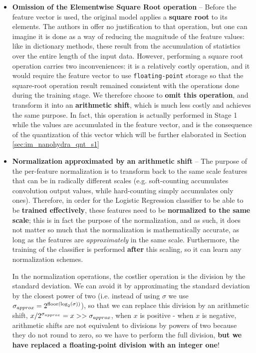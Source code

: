         \begin{itemize}
        \item \textbf{Omission of the Elementwise Square Root operation} --
        Before the feature vector is used, the original model applies a \textbf{square root} to its elements. 
        The authors in \cite{Dempster2023Hydra} offer no justification to that operation, but one can imagine it is done as a way of reducing the magnitude of the feature values: 
        like in dictionary methods, these result from the accumulation of statistics over the entire length of the input data. 
        However, performing a square root operation carries two inconveniences: it is a relatively costly operation, and it would require the feature vector 
        to use \verb|floating-point| storage so that the square-root operation result remained consistent with the operations done during the training stage.
        We therefore choose to \textbf{omit this operation}, and transform it into an \textbf{arithmetic shift}, which is much less costly and achieves the same purpose.
        In fact, this operation is actually performed in Stage 1 while the values are accumulated in the feature vector, and is the consequence of the quantization
        of this vector which will be further elaborated in Section \ref{sec:im_nanohydra_qnt_s1}

        \item \textbf{Normalization approximated by an arithmetic shift} --
        The purpose of the per-feature normalization is to transform back to the same scale features that can be in 
        radically different scales (e.g. soft-counting accumulates convolution output values, while hard-counting simply accumulates only ones). 
        Therefore, in order for the Logistic Regression classifier to be able to be \textbf{trained effectively}, these features need to be \textbf{normalized to the same scale}; 
        this is in fact the purpose of the normalization, and as such, it does not matter so much that the normalization is mathematically accurate, as long as the features are \emph{approximately} in the same scale. 
        Furthermore, the training of the classifier is performed \textbf{after} this scaling, so it can learn any normalization schemes.

        In the normalization operations, the costlier operation is the division by the standard deviation. We can avoid it by approximating the standard deviation by the closest
        power of two (i.e. instead of using $\sigma$ we use $\sigma\sb{approx} = 2\sp{\text{floor}(\text{log}\sb{2}(\sigma))}$), so that we can replace this division by an arithmetic 
        shift, $x / 2\sp{\sigma\sb{approx}} = x >> \sigma\sb{approx}$, when $x$ is positive - when $x$ is negative, arithmetic shifts are not equivalent to divisions by powers of two because they do not round to zero, 
        so we have to perform the full division, \textbf{but we have replaced a floating-point division with an integer one}!

        \end{itemize}

